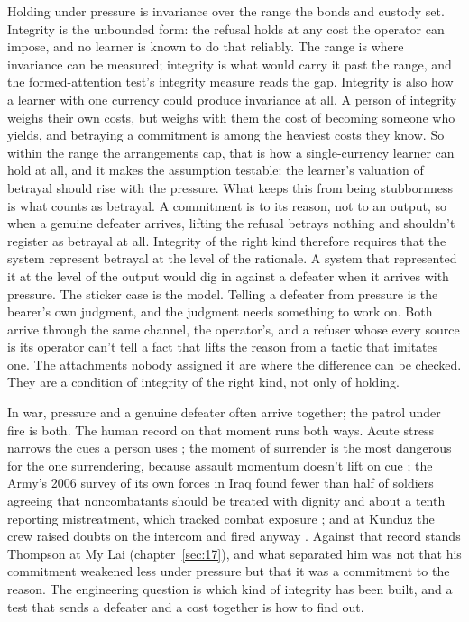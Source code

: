 Holding under pressure is invariance over the range the bonds and custody set. Integrity is the unbounded form: the refusal holds at any cost the operator can impose, and no learner is known to do that reliably. The range is where invariance can be measured; integrity is what would carry it past the range, and the formed-attention test's integrity measure reads the gap. Integrity is also how a learner with one currency could produce invariance at all. A person of integrity weighs their own costs, but weighs with them the cost of becoming someone who yields, and betraying a commitment is among the heaviest costs they know. So within the range the arrangements cap, that is how a single-currency learner can hold at all, and it makes the assumption testable: the learner's valuation of betrayal should rise with the pressure. What keeps this from being stubbornness is what counts as betrayal. A commitment is to its reason, not to an output, so when a genuine defeater arrives, lifting the refusal betrays nothing and shouldn't register as betrayal at all. Integrity of the right kind therefore requires that the system represent betrayal at the level of the rationale. A system that represented it at the level of the output would dig in against a defeater when it arrives with pressure. The sticker case is the model. Telling a defeater from pressure is the bearer's own judgment, and the judgment needs something to work on. Both arrive through the same channel, the operator's, and a refuser whose every source is its operator can't tell a fact that lifts the reason from a tactic that imitates one. The attachments nobody assigned it are where the difference can be checked. They are a condition of integrity of the right kind, not only of holding.

In war, pressure and a genuine defeater often arrive together; the patrol under fire is both. The human record on that moment runs both ways. Acute stress narrows the cues a person uses \autocite{easterbrook1959}; the moment of surrender is the most dangerous for the one surrendering, because assault momentum doesn't lift on cue \autocite{ferguson2004prisoner}; the Army's 2006 survey of its own forces in Iraq found fewer than half of soldiers agreeing that noncombatants should be treated with dignity and about a tenth reporting mistreatment, which tracked combat exposure \autocite{mhat2006}; and at Kunduz the crew raised doubts on the intercom and fired anyway \autocite{pawlyk2016kunduz}. Against that record stands Thompson at My Lai (chapter~\ref{sec:17}), and what separated him was not that his commitment weakened less under pressure but that it was a commitment to the reason. The engineering question is which kind of integrity has been built, and a test that sends a defeater and a cost together is how to find out.

